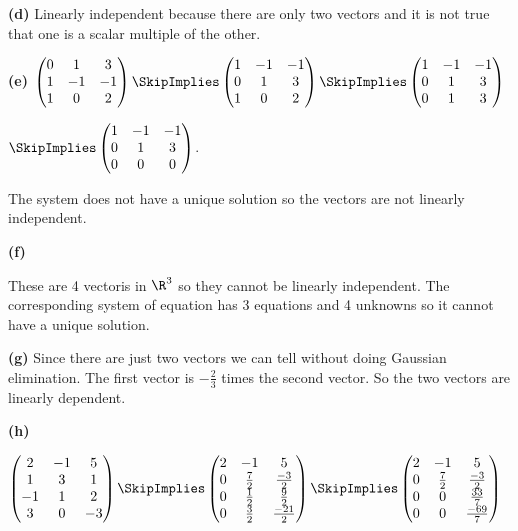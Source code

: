 \documentclass[oneside,12pt]{amsart}
\begin{document}
\textbf{(d)} Linearly independent because there are only two vectors and it
is not true that one is a scalar multiple of the other.

\bigskip

\textbf{(e)}
$
\begin{pmatrix}
0 & 1 & 3 \\
1 & -1 & -1 \\
1 & 0 & 2
\end{pmatrix}
\SkipImplies
\begin{pmatrix}
1 & -1 & -1 \\
0 & 1 & 3 \\
1 & 0 & 2
\end{pmatrix}
\SkipImplies
\begin{pmatrix}
1 & -1 & -1 \\
0 & 1 & 3 \\
0 & 1 & 3
\end{pmatrix}
$

$
\SkipImplies
\begin{pmatrix}
1 & -1 & -1 \\
0 & 1 & 3 \\
0 & 0 & 0
\end{pmatrix}
$.

The system does not have a unique solution so the vectors are not linearly
independent.

\bigskip

\textbf{(f)}

\bigskip

These are 4 vectoris in $\R^3$ so they cannot be linearly independent. The
corresponding system of equation has 3 equations and 4 unknowns so it cannot
have a unique solution.

\bigskip

\textbf{(g)} Since there are just two vectors we can tell without doing
Gaussian elimination. The first vector is $-\frac{2}{3}$ times the second
vector. So the two vectors are linearly dependent.

\bigskip

\textbf{(h)}

$
\begin{pmatrix}
2 & -1 & 5 \\
1 & 3 & 1 \\
-1 & 1 & 2 \\
3 & 0 & -3
\end{pmatrix}
\SkipImplies
\begin{pmatrix}
2 & -1 & 5 \\
0 & \frac{7}{2} & \frac{-3}{2} \\
0 & \frac{1}{2} & \frac{9}{2} \\
0 & \frac{3}{2} & \frac{-21}{2}
\end{pmatrix}
\SkipImplies
\begin{pmatrix}
2 & -1 & 5 \\
0 & \frac{7}{2} & \frac{-3}{2} \\
0 & 0 & \frac{33}{7} \\
0 & 0 & \frac{-69}{7}
\end{pmatrix}
$
\end{document}
